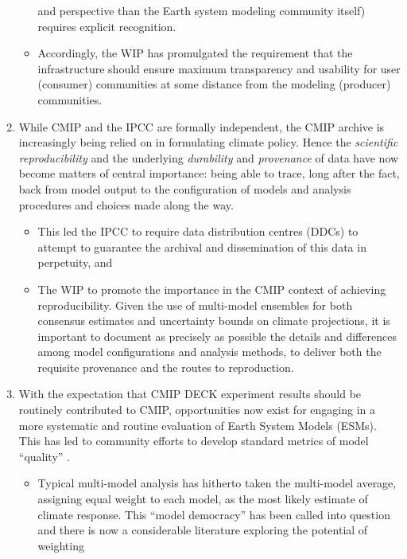 \documentclass[gmd,manuscript]{copernicus}
\newcommand{\pipref}[1] {\citep{ref:#1}}
\begin{document}
\begin{enumerate}
\begin{itemize}
    and perspective than the Earth system modeling community itself)
    requires explicit recognition.
  \item Accordingly, the WIP has promulgated the requirement that the
    infrastructure should ensure maximum transparency and usability
    for user (consumer) communities at some distance from the modeling
    (producer) communities.
  \end{itemize}
\item\label{repro} While CMIP and the IPCC are formally independent,
  the CMIP archive is increasingly being relied on in formulating
  climate policy. Hence the \emph{scientific reproducibility}
  \pipref{collinstabak2014} and the underlying \emph{durability} and
  \emph{provenance} of data have now become matters of central
  importance: being able to trace, long after the fact, back from
  model output to the configuration of models and analysis procedures
  and choices made along the way.
  \begin{itemize}
  \item This led the IPCC to require data distribution centres (DDCs)
    to attempt to guarantee the archival and dissemination of this
    data in perpetuity, and
  \item The WIP to promote the importance in the CMIP context of
    achieving reproducibility. Given the use of multi-model ensembles
    for both consensus estimates and uncertainty bounds on climate
    projections, it is important to document as precisely as possible
    the details and differences among model configurations and
    analysis methods, to deliver both the requisite provenance and the
    routes to reproduction.
  \end{itemize}
\item\label{analysis} With the expectation that CMIP DECK experiment
  results should be routinely contributed to CMIP, opportunities now
  exist for engaging in a more systematic and routine evaluation of
  Earth System Models (ESMs). This has led to community efforts to
  develop standard metrics of model ``quality''
  \citep{ref:eyringetal2016,ref:gleckleretal2016}.
  \begin{itemize}
  \item Typical multi-model analysis has hitherto taken the
    multi-model average, assigning equal weight to each model, as the
    most likely estimate of climate response. This ``model democracy''
    \pipref{knutti2010} has been called into question and there is now
    a considerable literature exploring the potential of weighting

\end{itemize}
\end{enumerate}
\end{document}
